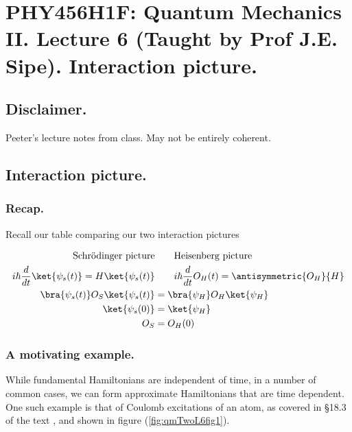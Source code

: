 
%

\chapter{PHY456H1F: Quantum Mechanics II.  Lecture 6 (Taught by Prof J.E. Sipe).  Interaction picture.}
\label{chap:qmTwoL6}
{}
\date{Sept 26, 2011}

\beginArtWithToc

\section{Disclaimer.}

Peeter's lecture notes from class.  May not be entirely coherent.

\section{Interaction picture.}
\subsection{Recap.}

Recall our table comparing our two interaction pictures

\begin{align*}
\text{Schr\"{o}dinger picture} &\qquad \text{Heisenberg picture} \\
i \hbar \frac{d}{dt} \ket{\psi_s(t)} = H \ket{\psi_s(t)} &\qquad i \hbar \frac{d}{dt} O_H(t) = \antisymmetric{O_H}{H} \\
\bra{\psi_s(t)} O_S \ket{\psi_s(t)} &= \bra{\psi_H} O_H \ket{\psi_H} \\
\ket{\psi_s(0)} &= \ket{\psi_H} \\
O_S &= O_H(0)
\end{align*}

\subsection{A motivating example.}

While fundamental Hamiltonians are independent of time, in a number of common cases, we can form approximate Hamiltonians that are time dependent.  One such example is that of Coulomb excitations of an atom, as covered in \S 18.3 of the text \cite{desai2009quantum}, and shown in figure (\ref{fig:qmTwoL6fig1}).

